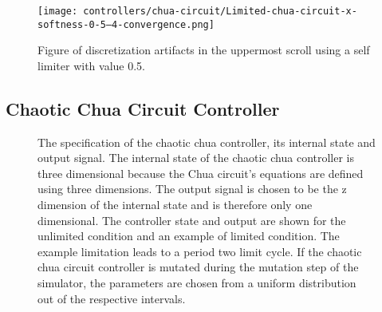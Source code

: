 \documentclass[main]{subfiles}
\begin{document}
\begin{figure}[H]
\centering
\texttt{[image: controllers/chua-circuit/Limited-chua-circuit-x-softness-0-5--4-convergence.png]}
\caption[Figure showing discretization artifacts]{Figure of discretization artifacts in the uppermost scroll using a self limiter with value 0.5.}
\label{figure:x-0.5-discretization}
\end{figure}

\subsection{Chaotic Chua Circuit Controller}

\begin{figure}[H]
\centering


\caption[The chaotic chua controller]{The specification of the chaotic chua controller, its internal state and output signal. The internal state of the chaotic chua controller is three dimensional because the Chua circuit's equations are defined using three dimensions. The output signal is chosen to be the z dimension of the internal state and is therefore only one dimensional. The controller state and output are shown for the unlimited condition and an example of limited condition. The example limitation leads to a period two limit cycle. If the chaotic chua circuit controller is mutated during the mutation step of the simulator, the parameters are chosen from a uniform distribution out of the respective intervals.}
\label{figure:chua-controller}
\end{figure}
\end{document}
